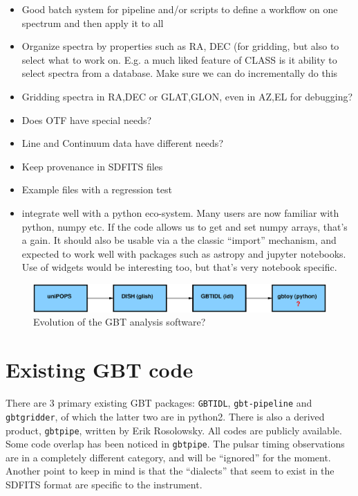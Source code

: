 \documentclass[12pt,a4paper]{article}
\begin{document}
\begin{itemize}

\item Good batch system for pipeline and/or scripts to define a workflow on one spectrum
  and then apply it to all
  
\item Organize spectra by properties such as RA, DEC (for gridding,
  but also to select what to work on. E.g. a much liked feature of
  CLASS is it ability to select spectra from a database. Make sure we
  can do incrementally do this

\item Gridding spectra in RA,DEC or GLAT,GLON, even in AZ,EL for debugging?

\item Does OTF have special needs?

\item Line and Continuum data have different needs?

\item Keep provenance in SDFITS files

\item Example files with a regression test  

\item integrate well with a python eco-system. Many users are now familiar with
  python, numpy etc.  If the code allows us to get and set numpy arrays,
  that's a gain. It should also be usable via a the classic ``import''
  mechanism, and expected to work well with packages such as astropy and jupyter
  notebooks. Use of widgets would be interesting too, but that's very notebook
  specific.
\end{itemize}

\begin{figure}[ht]
\centering
  \includegraphics[width=\textwidth]{fig1.eps}
\caption{\label{evolution} Evolution of the GBT analysis software?}
\end{figure}


\section{Existing GBT code}

There are 3 primary existing GBT packages: {\tt GBTIDL}, {\tt gbt-pipeline} and
{\tt gbtgridder}, of which the latter two are in python2. There is also
a derived product, {\tt gbtpipe}, written by Erik Rosolowsky. All codes are
publicly available. Some code overlap has been noticed in {\tt gbtpipe}.
The pulsar timing observations are
in a completely different category, and will be ``ignored'' for the
moment. Another point to keep in mind is that
the ``dialects'' that seem to exist in the SDFITS format are specific to the instrument.
\end{document}
